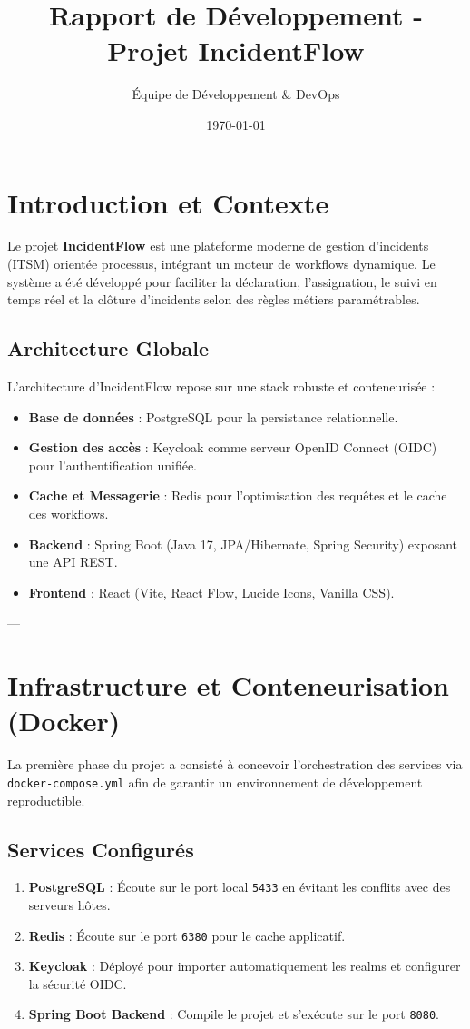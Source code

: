 \documentclass[12pt]{article}
\title{Rapport de Développement - Projet IncidentFlow}
\author{Équipe de Développement \& DevOps}
\date{\today}
\begin{document}
\maketitle
\tableofcontents
\newpage

\section{Introduction et Contexte}
Le projet \textbf{IncidentFlow} est une plateforme moderne de gestion d'incidents (ITSM) orientée processus, intégrant un moteur de workflows dynamique. Le système a été développé pour faciliter la déclaration, l'assignation, le suivi en temps réel et la clôture d'incidents selon des règles métiers paramétrables. 

\subsection{Architecture Globale}
L'architecture d'IncidentFlow repose sur une stack robuste et conteneurisée :
\begin{itemize}
    \item \textbf{Base de données} : PostgreSQL pour la persistance relationnelle.
    \item \textbf{Gestion des accès} : Keycloak comme serveur OpenID Connect (OIDC) pour l'authentification unifiée.
    \item \textbf{Cache et Messagerie} : Redis pour l'optimisation des requêtes et le cache des workflows.
    \item \textbf{Backend} : Spring Boot (Java 17, JPA/Hibernate, Spring Security) exposant une API REST.
    \item \textbf{Frontend} : React (Vite, React Flow, Lucide Icons, Vanilla CSS).
\end{itemize}

---

\section{Infrastructure et Conteneurisation (Docker)}
La première phase du projet a consisté à concevoir l'orchestration des services via \texttt{docker-compose.yml} afin de garantir un environnement de développement reproductible.

\subsection{Services Configurés}
\begin{enumerate}
    \item \textbf{PostgreSQL} : Écoute sur le port local \texttt{5433} en évitant les conflits avec des serveurs hôtes.
    \item \textbf{Redis} : Écoute sur le port \texttt{6380} pour le cache applicatif.
    \item \textbf{Keycloak} : Déployé pour importer automatiquement les realms et configurer la sécurité OIDC.
    \item \textbf{Spring Boot Backend} : Compile le projet et s'exécute sur le port \texttt{8080}.
\end{enumerate}
\end{document}
